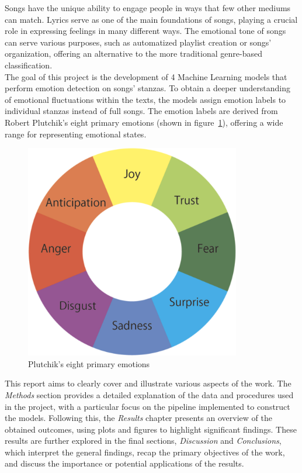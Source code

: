 Songs have the unique ability to engage people in ways that few other mediums can match. 
Lyrics serve as one of the main foundations of songs, playing a crucial role in
expressing feelings in many different ways.
The emotional tone of songs can serve various purposes, such as
automatized playlist creation or songs' organization,
offering an alternative to the more traditional genre-based classification. \\
The goal of this project is the development of 4 Machine Learning models
that perform emotion detection on songs' stanzas. To obtain a deeper
understanding of emotional fluctuations within the texts, the models assign
emotion labels to individual stanzas instead of full songs.
The emotion labels are derived from Robert Plutchik's eight primary
emotions (shown in figure~\ref{fig:primary_emotions}), offering a wide range for representing emotional states.\\
\begin{figure}[H]
    \centering
    \includegraphics[scale= 0.30]{pictures/plutchik_primary_emotions.png}
    \caption{Plutchik's eight primary emotions}
    \label{fig:primary_emotions}
\end{figure}

This report aims to clearly cover and illustrate various aspects of the work. 
The \textit{Methods} section provides a detailed explanation of the data and procedures used in the project, with a particular focus on the pipeline implemented to construct the models. 
Following this, the \textit{Results} chapter presents an overview of the obtained outcomes, using plots and figures to highlight significant findings. 
These results are further explored in the final sections, \textit{Discussion} and \textit{Conclusions}, which interpret the general findings, recap the primary objectives of the work, and discuss the importance or potential applications of the results.


